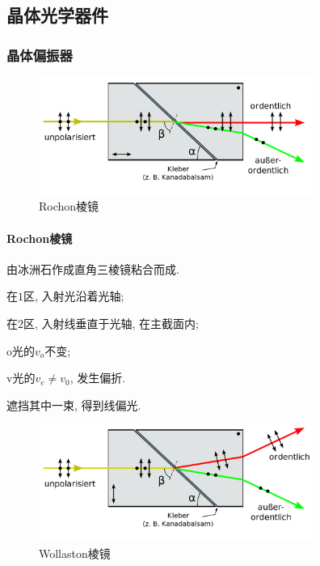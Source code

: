 \documentclass{ctexart}
\begin{document}


\subsection{晶体光学器件} %
\label{sub:晶体光学器件}

\subsubsection{晶体偏振器} %
\label{ssub:晶体偏振器}

\begin{figure}[ht]
    \centering
    \includegraphics[width=9cm]{src/Rochon.png}
    \caption{Rochon棱镜}
\end{figure}

\paragraph{Rochon棱镜} %
\label{par:rochon棱镜}

由冰洲石作成直角三棱镜粘合而成.
\begin{cenum}
    \item 在$1$区, 入射光沿着光轴;
    \item 在$2$区, 入射线垂直于光轴, 在主截面内;
    \begin{cenum}
        \item o光的$v_o$不变;
        \item v光的$v_e\neq v_0$, 发生偏折.
    \end{cenum}
\end{cenum}
遮挡其中一束, 得到线偏光.


\begin{figure}[ht]
    \centering
    \includegraphics[width=9cm]{src/Wollaston.png}
    \caption{Wollaston棱镜}
\end{figure}
\end{document}
